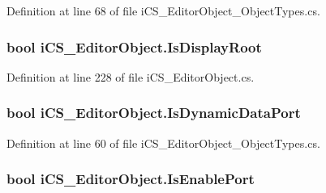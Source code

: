 Definition at line 68 of file i\+C\+S\+\_\+\+Editor\+Object\+\_\+\+Object\+Types.\+cs.

\hypertarget{classi_c_s___editor_object_abf2c7ffc1d7410cb9aa1bad17b30eb1b}{
\subsubsection[{Is\+Display\+Root}]{\setlength{\rightskip}{0pt plus 5cm}bool i\+C\+S\+\_\+\+Editor\+Object.\+Is\+Display\+Root\hspace{0.3cm}{\ttfamily [get]}}}\label{classi_c_s___editor_object_abf2c7ffc1d7410cb9aa1bad17b30eb1b}


Definition at line 228 of file i\+C\+S\+\_\+\+Editor\+Object.\+cs.

\hypertarget{classi_c_s___editor_object_a1a8ac84e63f1f736ae645654b3c1044d}{
\subsubsection[{Is\+Dynamic\+Data\+Port}]{\setlength{\rightskip}{0pt plus 5cm}bool i\+C\+S\+\_\+\+Editor\+Object.\+Is\+Dynamic\+Data\+Port\hspace{0.3cm}{\ttfamily [get]}}}\label{classi_c_s___editor_object_a1a8ac84e63f1f736ae645654b3c1044d}


Definition at line 60 of file i\+C\+S\+\_\+\+Editor\+Object\+\_\+\+Object\+Types.\+cs.

\hypertarget{classi_c_s___editor_object_a86229eae7b394ecec2f89891f8f3154e}{
\subsubsection[{Is\+Enable\+Port}]{\setlength{\rightskip}{0pt plus 5cm}bool i\+C\+S\+\_\+\+Editor\+Object.\+Is\+Enable\+Port\hspace{0.3cm}{\ttfamily [get]}}}\label{classi_c_s___editor_object_a86229eae7b394ecec2f89891f8f3154e}


